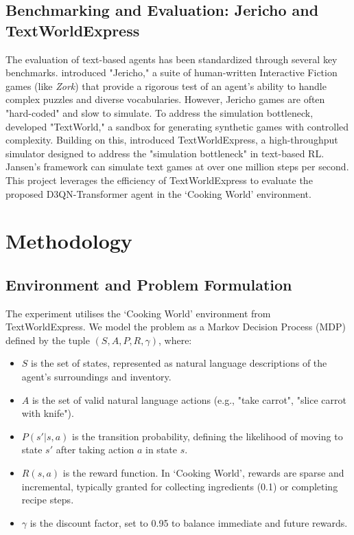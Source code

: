 \documentclass[11pt,a4paper]{article}
\begin{document}
\subsection{Benchmarking and Evaluation: Jericho and TextWorldExpress}
The evaluation of text-based agents has been standardized through several key benchmarks. \citet{hausknecht2020interactive} introduced "Jericho," a suite of human-written Interactive Fiction games (like \textit{Zork}) that provide a rigorous test of an agent's ability to handle complex puzzles and diverse vocabularies. However, Jericho games are often "hard-coded" and slow to simulate. To address the simulation bottleneck, \citet{cote2018textworld} developed "TextWorld," a sandbox for generating synthetic games with controlled complexity. Building on this, \citet{jansen2022textworldexpress} introduced TextWorldExpress, a high-throughput simulator designed to address the "simulation bottleneck" in text-based RL. Jansen's framework can simulate text games at over one million steps per second. This project leverages the efficiency of TextWorldExpress to evaluate the proposed D3QN-Transformer agent in the `Cooking World' environment.

\section{Methodology}

\subsection{Environment and Problem Formulation}
The experiment utilises the `Cooking World' environment from TextWorldExpress. We model the problem as a Markov Decision Process (MDP) defined by the tuple $(S, A, P, R, \gamma)$, where:
\begin{itemize}
    \item $S$ is the set of states, represented as natural language descriptions of the agent's surroundings and inventory.
    \item $A$ is the set of valid natural language actions (e.g., "take carrot", "slice carrot with knife").
    \item $P(s' | s, a)$ is the transition probability, defining the likelihood of moving to state $s'$ after taking action $a$ in state $s$.
    \item $R(s, a)$ is the reward function. In `Cooking World', rewards are sparse and incremental, typically granted for collecting ingredients (0.1) or completing recipe steps.
    \item $\gamma$ is the discount factor, set to 0.95 to balance immediate and future rewards.
\end{itemize}
\end{document}
